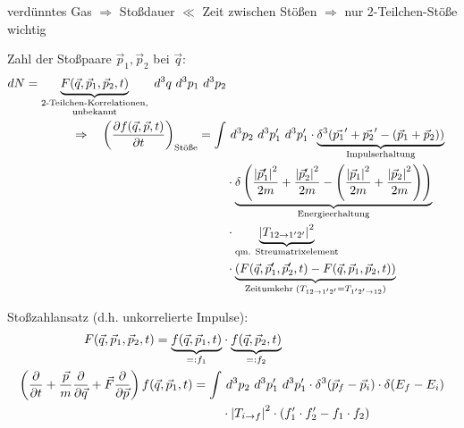 verdünntes Gas $\Rightarrow$ Stoßdauer $\ll$ Zeit zwischen Stößen $\Rightarrow$ nur 2-Teilchen-Stöße wichtig
\begin{figure}[h]
    \centering
\end{figure}

Zahl der Stoßpaare $\Vec{p}_1,\Vec{p}_2$ bei $\Vec{q}$:
\begin{align}
    dN = \underbrace{F(\Vec{q},\Vec{p}_1,\Vec{p}_2,t)}_{\substack{\text{2-Teilchen-Korrelationen,}\\ \text{unbekannt}}}\ d^3q \ d^3p_1 \ d^3p_2 \\
    \Rightarrow \quad \left(\pdv{f(\Vec{q},\Vec{p},t)}{t}\right)_{\text{Stöße}} = \int &\ d^3p_2 \ d^3p_1^\prime \ d^3p_1^\prime \cdot \underbrace{\delta^3(\Vec{p_1}^\prime + \Vec{p_2}^\prime - (\Vec{p}_1 + \Vec{p}_2)) }_{\text{Impulserhaltung}}\\
    &\cdot \underbrace{\delta\left(\frac{\abs{\Vec{p}_1^\prime}^2}{2m} + \frac{\abs{\Vec{p}_2^\prime}^2}{2m} - \left(\frac{\abs{\Vec{p}_1}^2}{2m} + \frac{\abs{\Vec{p}_2}^2}{2m}\right)\right)}_{\text{Energieerhaltung}} \\
    &\cdot \underbrace{\abs{T_{12\rightarrow1^\prime2^\prime}}^2}_{\text{qm. Streumatrixelement}} \\
    &\cdot \underbrace{\left(F(\Vec{q},\Vec{p}_1^\prime,\Vec{p}_2^\prime,t) - F(\Vec{q},\Vec{p}_1,\Vec{p}_2,t) \right)}_{\text{Zeitumkehr} \; (T_{12\rightarrow1^\prime2^\prime} = T_{1^\prime2^\prime\rightarrow12})}
\end{align}

Stoßzahlansatz (d.h. unkorrelierte Impulse):
\begin{align}
    F(\Vec{q},\Vec{p}_1,\Vec{p}_2,t) = \underbrace{f(\Vec{q},\Vec{p}_1,t)}_{=: f_1} &\cdot \underbrace{f(\Vec{q},\Vec{p}_2,t)}_{=: f_2} \\ \label{eq.Boltzmann}
    \left( \pdv{}{t} + \frac{\Vec{p}}{m} \pdv{}{\Vec{q}} + \Vec{F} \pdv{}{\Vec{p}} \right) f(\Vec{q},\Vec{p}_1,t) = \int &\ d^3p_2 \ d^3p_1^\prime \ d^3p_1^\prime \cdot \delta^3(\Vec{p}_f-\Vec{p}_i) \cdot \delta(E_f-E_i) \\
    &\cdot \abs{T_{i\rightarrow f}}^2 \cdot \left(f_1^\prime \cdot f_2^\prime -f_1\cdot f_2 \right)
\end{align}

